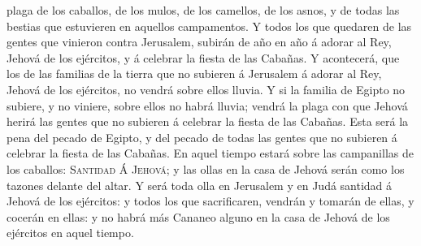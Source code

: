 plaga de los caballos, de los mulos, de los camellos, de los asnos, y de
todas las bestias que estuvieren en aquellos campamentos.
 Y todos los que quedaren de las gentes que vinieron
contra Jerusalem, subirán de año en año á adorar al Rey, Jehová de los
ejércitos, y á celebrar la fiesta de las Cabañas.  Y
acontecerá, que los de las familias de la tierra que no subieren á
Jerusalem á adorar al Rey, Jehová de los ejércitos, no vendrá sobre
ellos lluvia.  Y si la familia de Egipto no subiere, y no
viniere, sobre ellos no habrá lluvia; vendrá la plaga con que Jehová
herirá las gentes que no subieren á celebrar la fiesta de las Cabañas.
 Esta será la pena del pecado de Egipto, y del pecado de
todas las gentes que no subieren á celebrar la fiesta de las Cabañas.
 En aquel tiempo estará sobre las campanillas de los
caballos: \textsc{Santidad} Á \textsc{Jehová}; y las ollas en la casa de
Jehová serán como los tazones delante del altar.  Y será
toda olla en Jerusalem y en Judá santidad á Jehová de los ejércitos: y
todos los que sacrificaren, vendrán y tomarán de ellas, y cocerán en
ellas: y no habrá más Cananeo alguno en la casa de Jehová de los
ejércitos en aquel tiempo.
